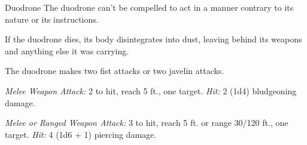 \documentclass[10pt,a4paper,twoside,bg=print,twocolumn,openany,nodeprecatedcode]{dndbook}
\begin{document}
\begin{DndMonster}[float=t]{Duodrone}
\DndMonsterBasics[
armor-class = {15 (natural armor)},
hit-points = {\DndDice{2d8 + 2}},
speed = {30 ft.}
]
\DndMonsterAbilityScores[
 str = 11,
 dex = 13,
 con = 12,
 int = 6,
 wis = 10,
 cha = 7
]
\DndMonsterDetails[
senses = {truesight 120 ft., passive perception 10},
languages = {Modron},
challenge = 1/4,
]
The duodrone can't be compelled to act in a manner contrary to its nature or its instructions.

If the duodrone dies, its body disintegrates into dust, leaving behind its weapons and anything else it was carrying.

The duodrone makes two fist attacks or two javelin attacks.

\textsl{Melee Weapon Attack:} 2 to hit, reach 5 ft., one target. \textsl{Hit:} 2 (1d4) bludgeoning damage.

\textsl{Melee or Ranged Weapon Attack:} 3 to hit, reach 5 ft. or range 30/120 ft., one target. \textsl{Hit:} 4 (1d6 + 1) piercing damage.

\end{DndMonster}
\end{document}
